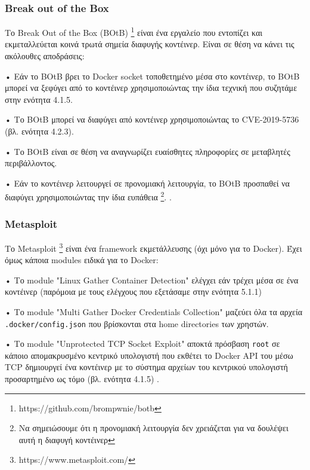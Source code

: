 \subsubsection{\textlatin{Break out of the Box}}

Το \textlatin{Break Out of the Box (BOtB)}
\footnote{\textlatin{https://github.com/brompwnie/botb}} είναι ένα εργαλείο που
εντοπίζει και εκμεταλλεύεται κοινά τρωτά σημεία διαφυγής κοντέινερ. Είναι σε
θέση να κάνει τις ακόλουθες αποδράσεις:

• Εάν το \textlatin{BOtB} βρει το \textlatin{Docker socket} τοποθετημένο μέσα
στο κοντέινερ, το \textlatin{BOtB} μπορεί να ξεφύγει από το κοντέινερ
χρησιμοποιώντας την ίδια τεχνική που συζητάμε στην ενότητα 4.1.5.

• Το \textlatin{BOtB} μπορεί να διαφύγει από κοντέινερ χρησιμοποιώντας το
\textlatin{CVE-2019-5736} (βλ. ενότητα 4.2.3).

• Το \textlatin{BOtB} είναι σε θέση να αναγνωρίζει ευαίσθητες πληροφορίες σε
μεταβλητές περιβάλλοντος.

• Εάν το κοντέινερ λειτουργεί σε προνομιακή λειτουργία, το BOtB προσπαθεί να
διαφύγει χρησιμοποιώντας την ίδια ευπάθεια \footnote{Να σημειώσουμε ότι η
προνομιακή λειτουργία δεν χρειάζεται για να δουλέψει αυτή η διαφυγή κοντέινερ}.
\cite{TrailOfBits-Docker-Escape}.

\subsubsection{\textlatin{Metasploit}}

Το \textlatin{Metasploit} \footnote{https://www.metasploit.com/} είναι ένα
\textlatin{framework} εκμετάλλευσης (όχι μόνο για το \textlatin{Docker}). Έχει
όμως κάποια \textlatin{modules} ειδικά για το \textlatin{Docker}:

• Το \textlatin{module} "\textlatin{Linux Gather Container Detection}" ελέγχει
εάν τρέχει μέσα σε ένα κοντέινερ (παρόμοια με τους ελέγχους που εξετάσαμε στην
ενότητα 5.1.1) \cite{Metasploit-Linux-Gather-Container-Detection}

• Το \textlatin{module} "\textlatin{Multi Gather Docker Credentials Collection}"
μαζεύει όλα τα αρχεία \texttt{\textlatin{.docker/config.json}} που βρίσκονται
στα \textlatin{home directories} των χρηστών.
\cite{More-Secure-Non-Root-Container}

• Το \textlatin{module} "\textlatin{Unprotected TCP Socket Exploit}" αποκτά
πρόσβαση \texttt{\textlatin{root}} σε κάποιο απομακρυσμένο κεντρικό υπολογιστή
που εκθέτει το \textlatin{Docker API} του μέσω \textlatin{TCP} δημιουργεί ένα
κοντέινερ με το σύστημα αρχείων του κεντρικού υπολογιστή προσαρτημένο ως τόμο
(βλ. ενότητα 4.1.5) \cite{Metasploit-Unprotected-TCP-Socket}.

